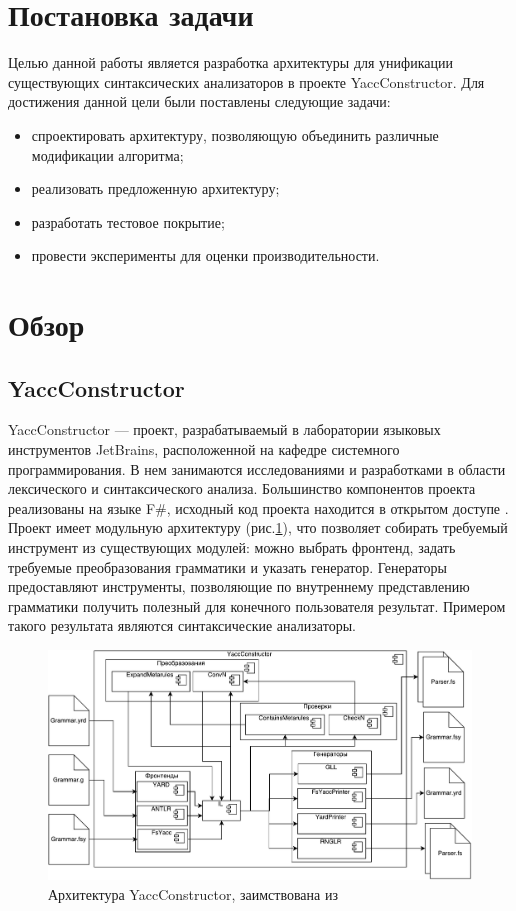 \documentclass[14pt]{matmex-diploma}
\begin{document}
\section{Постановка задачи}
Целью данной работы является разработка архитектуры для унификации существующих синтаксических анализаторов в проекте \newline YaccConstructor. Для достижения данной цели были поставлены следующие задачи:
\begin{itemize}
    \item спроектировать архитектуру, позволяющую объединить различные модификации алгоритма;
    \item реализовать предложенную архитектуру;
    \item разработать тестовое покрытие;
    \item провести эксперименты для оценки производительности.
\end{itemize}

\section{Обзор}
\subsection{YaccConstructor}
YaccConstructor --- проект, разрабатываемый в лаборатории языковых инструментов JetBrains, расположенной на кафедре системного программирования. В нем занимаются исследованиями и разработками в области лексического и синтаксического анализа. Большинство компонентов проекта реализованы на языке F\#, исходный код проекта находится в открытом доступе \cite{YaccConstructor}. Проект имеет модульную архитектуру (рис.\ref{fig:YCArch}), что позволяет собирать требуемый инструмент из существующих модулей: можно выбрать фронтенд, задать требуемые преобразования грамматики и указать генератор. Генераторы предоставляют инструменты, позволяющие по внутреннему представлению грамматики получить полезный для конечного пользователя результат. Примером такого результата являются синтаксические анализаторы.

\begin{figure}[h]
	\includegraphics[width=\textwidth]{images/YCArch}
	\caption{Архитектура YaccConstructor, заимствована из \cite{gsvPhd}}
	\label{fig:YCArch}
\end{figure}
\end{document}
